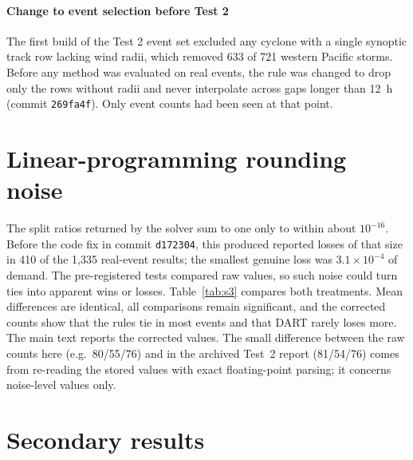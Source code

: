 \documentclass[12pt]{article}
\begin{document}
\paragraph{Change to event selection before Test 2} The first build of the Test 2 event set excluded any cyclone with a single synoptic track row lacking wind radii, which removed 633 of 721 western Pacific storms. Before any method was evaluated on real events, the rule was changed to drop only the rows without radii and never interpolate across gaps longer than 12~h (commit \texttt{269fa4f}). Only event counts had been seen at that point.

\section{Linear-programming rounding noise}
\label{sec:s3}

The split ratios returned by the solver sum to one only to within about $10^{-16}$. Before the code fix in commit \texttt{d172304}, this produced reported losses of that size in 410 of the 1{,}335 real-event results; the smallest genuine loss was $3.1\times10^{-4}$ of demand. The pre-registered tests compared raw values, so such noise could turn ties into apparent wins or losses. Table~\ref{tab:s3} compares both treatments. Mean differences are identical, all comparisons remain significant, and the corrected counts show that the rules tie in most events and that DART rarely loses more. The main text reports the corrected values. The small difference between the raw counts here (e.g.\ 80/55/76) and in the archived Test~2 report (81/54/76) comes from re-reading the stored values with exact floating-point parsing; it concerns noise-level values only.

\begin{table}[h]
\centering
\caption{Test 2 primary comparisons with raw values (as pre-registered) and with values below $10^{-9}$ of demand set to zero. B/W/T: scenarios in which DART lost less, lost more, or tied.}
\label{tab:s3}

\end{table}

\section{Secondary results}
\label{sec:s4}
\end{document}
